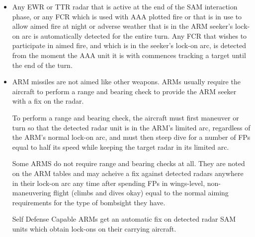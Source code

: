 \begin{itemize}

    \item{} Any EWR or TTR radar that is active at the end of the SAM interaction phase, or any FCR which is used with AAA plotted fire or that is in use to allow aimed fire at night or adverse weather that is in the ARM seeker's lock-on arc is automatically detected for the entire turn. Any FCR that wishes to participate in aimed fire, and which is in the seeker’s lock-on arc, is detected from the moment the AAA unit it is with commences tracking a target until the end of the turn.  


    \item{} ARM missiles are not aimed like other weapons. ARMs usually require the aircraft to perform a range and bearing check to provide the ARM seeker with a fix on the radar.

    To perform a range and bearing check, the aircraft must first maneuver or turn so that the detected radar unit is in the ARM’s limited arc, regardless of the ARM's normal lock-on arc, and must then steep dive for a number of FPs equal to half its speed while keeping the target radar in its limited arc.

    Some ARMS do not require range and bearing checks at all. They are noted on the ARM tables and may acheive a fix against detected radars anywhere in their lock-on arc any time after spending FPs in wings-level, non-maneuvering flight (climbs and dives okay) equal to the normal aiming requirements for the type of bombsight they have.
    


    Self Defense Capable ARMs get an automatic fix on detected radar SAM units which obtain lock-ons on their carrying aircraft. 


\end{itemize}


